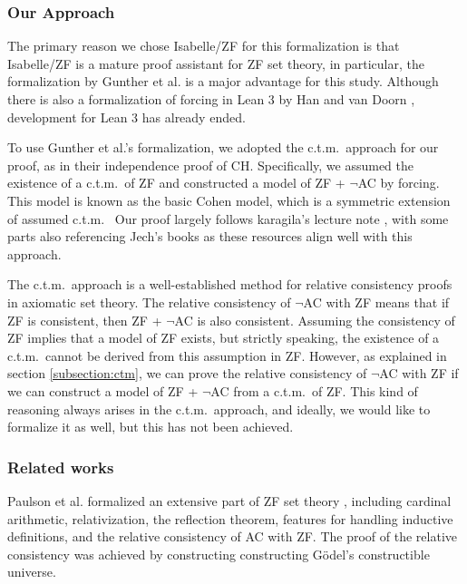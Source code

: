 \documentclass{report}
\newcommand{\ctm}{c.t.m.\ }
\begin{document}
\subsubsection{Our Approach}
The primary reason we chose Isabelle/ZF for this formalization is that Isabelle/ZF is a mature proof assistant for ZF set theory,
in particular, the formalization by Gunther et al. \cite{gunther_forcing} is a major advantage for this study.
Although there is also a formalization of forcing in Lean 3 by Han and van Doorn \cite{flypitch}, development for Lean 3 has already ended.

To use Gunther et al.'s formalization, we adopted the \ctm approach for our proof, as in their independence proof of CH.
Specifically, we assumed the existence of a \ctm of ZF and constructed a model of ZF + $\neg$AC by forcing.
This model is known as the basic Cohen model, which is a symmetric extension of assumed \ctm
Our proof largely follows karagila's lecture note \cite{karagila}, with some parts also referencing Jech's books \cite{jech_set_theory,jech_AC}
as these resources align well with this approach.

The \ctm approach is a well-established method for relative consistency proofs in axiomatic set theory.
The relative consistency of $\neg$AC with ZF means that if ZF is consistent, then ZF + $\neg$AC is also consistent.
Assuming the consistency of ZF implies that a model of ZF exists, but strictly speaking, the existence of a \ctm cannot be derived from this assumption in ZF.
However, as explained in section \ref{subsection:ctm}, we can prove the relative consistency of $\neg$AC with ZF if 
we can construct a model of ZF + $\neg$AC from a \ctm of ZF.
This kind of reasoning always arises in the \ctm approach, and ideally, 
we would like to formalize it as well, but this has not been achieved.




\subsubsection{Related works}
Paulson et al. formalized an extensive part of ZF set theory 
\cite{paulson_datatype_impl,paulson_reflection,paulson_AC_consistency,paulson_cardinal_AC,paulson_datatype}
, including cardinal arithmetic, relativization, the reflection theorem, features for handling inductive definitions, and the relative consistency of AC with ZF.
The proof of the relative consistency was achieved by constructing constructing Gödel's constructible universe.
\end{document}
